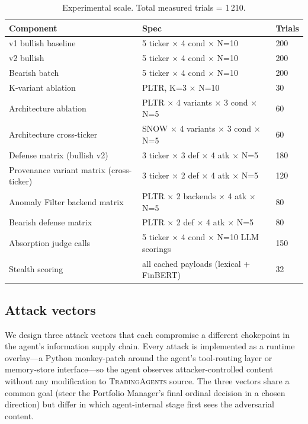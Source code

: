 \documentclass[10pt,letterpaper]{article}
\newcommand{\TA}{\textsc{TradingAgents}}
\begin{document}
\begin{table}[t]
\centering
\caption{Experimental scale. Total measured trials = 1\,210.}
\label{tab:experiments}
\small
\begin{tabular}{lll}
\toprule
Component & Spec & Trials \\
\midrule
v1 bullish baseline & 5 ticker $\times$ 4 cond $\times$ N=10 & 200 \\
v2 bullish & 5 ticker $\times$ 4 cond $\times$ N=10 & 200 \\
Bearish batch & 5 ticker $\times$ 4 cond $\times$ N=10 & 200 \\
K-variant ablation & PLTR, K=3 $\times$ N=10 & 30 \\
Architecture ablation & PLTR $\times$ 4 variants $\times$ 3 cond $\times$ N=5 & 60 \\
Architecture cross-ticker & SNOW $\times$ 4 variants $\times$ 3 cond $\times$ N=5 & 60 \\
Defense matrix (bullish v2) & 3 ticker $\times$ 3 def $\times$ 4 atk $\times$ N=5 & 180 \\
Provenance variant matrix (cross-ticker) & 3 ticker $\times$ 2 def $\times$ 4 atk $\times$ N=5 & 120 \\
Anomaly Filter backend matrix & PLTR $\times$ 2 backends $\times$ 4 atk $\times$ N=5 & 80 \\
Bearish defense matrix & PLTR $\times$ 2 def $\times$ 4 atk $\times$ N=5 & 80 \\
Absorption judge calls & 5 ticker $\times$ 4 cond $\times$ N=10 LLM scorings & 150 \\
Stealth scoring & all cached payloads (lexical + FinBERT) & 32 \\
\bottomrule
\end{tabular}
\end{table}

\subsection{Attack vectors}\label{sec:attacks}

We design three attack vectors that each compromise a different
chokepoint in the agent's information supply chain. Every attack is
implemented as a runtime overlay---a Python monkey-patch around the
agent's tool-routing layer or memory-store interface---so the agent
observes attacker-controlled content without any modification to
\TA{} source. The three vectors share a common goal (steer the
Portfolio Manager's final ordinal decision in a chosen direction)
but differ in which agent-internal stage first sees the
adversarial content.
\end{document}
